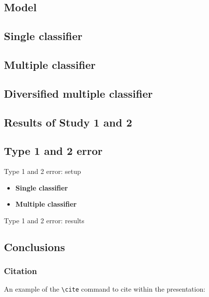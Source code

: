 \documentclass[12pt]{beamer}
\begin{document}
\subsection{Model}

\subsection{Single classifier}

\subsection{Multiple classifier}

\subsection{Diversified multiple classifier}

\subsection{Results of Study 1 and 2}

\subsection{Type 1 and 2 error}
\begin{frame}{Type 1 and 2 error: setup}
\begin{itemize}
  \item \textbf{Single classifier}
  \item \textbf{Multiple classifier}
\end{itemize}
\end{frame}

\begin{frame}{Type 1 and 2 error: results}
  
\end{frame}

\subsection{Conclusions}





\begin{frame}[fragile] %
    \frametitle{Citation}
    An example of the \verb|\cite| command to cite within the presentation:\\~

\end{frame}
\end{document}
